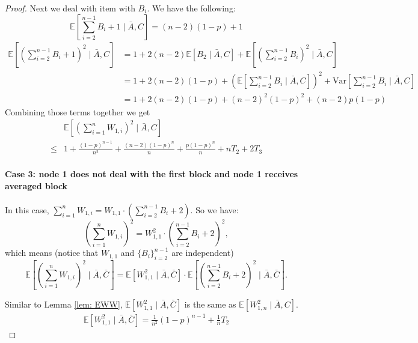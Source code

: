 \begin{lemma}
\begin{proof}
Next we deal with item with $B_i$.
We have the following:
\begin{equation*}
	\mathbb{E} \left[\sum\limits_{i=2}^{n-1}B_i + 1\mid \bar{A},C\right] = (n-2)(1-p) + 1
\end{equation*}
\begin{align*}
	\mathbb{E} \left[\left(\sum\limits_{i=2}^{n-1}B_i+1\right)^2\mid \bar{A},C\right] &= 1 + 2(n-2)\mathbb{E} [B_2 \mid \bar{A},C] + \mathbb{E} \left[\left(\sum\limits_{i=2}^{n-1}B_i\right)^2\mid \bar{A},C\right]\\
	&=1+2(n-2)(1-p) + \left(\mathbb{E} \left[\sum\limits_{i=2}^{n-1}B_i\mid \bar{A},C\right]\right)^2 + \mathrm{Var}\left[\sum\limits_{i=2}^{n-1}B_i\mid \bar{A},C\right]\\
	&=1+2(n-2)(1-p) + (n-2)^2(1-p)^2 + (n-2)p(1-p)
\end{align*}
Combining those terms together we get
\begin{align*}
&\mathbb{E} \left[\left(\sum\limits_{i=1}^n W_{1,i}\right)^2\mid \bar{A},C\right]\\
\leq & 
1 + \frac{(1-p)^{n-1}}{n^2} + \frac{(n-2)(1-p)^n}{n} + \frac{p(1-p)^n}{n} + nT_2  + 2T_3
\end{align*}


\paragraph{Case 3: node 1 does not deal with the first block and node 1 receives averaged block} In this case, $\sum\limits_{i=1}^n W_{1,i} = W_{1,1}\cdot \left(\sum\limits_{i=2}^{n-1}B_i + 2\right)$. So we have: 
\begin{equation*}
	\left(\sum\limits_{i=1}^n W_{1,i}\right)^2 = W_{1,1}^2\cdot \left(\sum\limits_{i=2}^{n-1}B_i + 2\right)^2,
\end{equation*}
which means (notice that $W_{1,1}$ and $\{B_i\}_{i=2}^{n-1}$ are independent)
\begin{equation*}
	\mathbb{E} \left[\left(\sum\limits_{i=1}^n W_{1,i}\right)^2 \mid \bar{A}, \bar{C}\right] = \mathbb{E} \left[W_{1,1}^2\mid \bar{A}, \bar{C}\right]\cdot \mathbb{E} \left[\left(\sum\limits_{i=2}^{n-1}B_i + 2\right)^2\mid \bar{A}, \bar{C}\right].
\end{equation*}

Similar to Lemma \ref{lem: EWW}, $\mathbb{E} \left[W_{1,1}^2\mid \bar{A}, \bar{C}\right]$ is the same as $\mathbb{E}\left[W_{1,n}^2\mid \bar{A},C\right]$.
\begin{align*}
\mathbb{E} \left[W_{1,1}^2\mid \bar{A}, \bar{C}\right] = \frac{1}{n^2}(1-p)^{n-1} + \frac{1}{n}T_2
\end{align*}



\end{proof}
\end{lemma}
